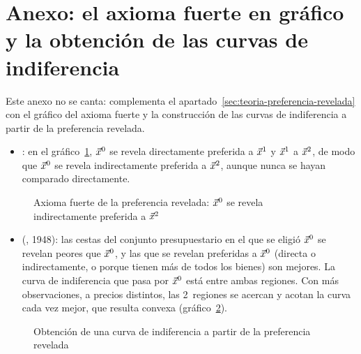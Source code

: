 \documentclass[11pt]{article}
\begin{document}
\section{Anexo: el axioma fuerte en gráfico\cortetitulo{} y la obtención de las curvas de indiferencia}\label{anexo:afpr}

\begin{notaopositor}
Este anexo no se canta: complementa el apartado~\ref{sec:teoria-preferencia-revelada} con el gráfico del axioma fuerte y la construcción de las curvas de indiferencia a partir de la preferencia revelada.
\end{notaopositor}

\begin{itemize}
\item {}: en el gráfico~\ref{fig:afpr}, $\vec{x}^0$ se revela directamente preferida a $\vec{x}^1$ y $\vec{x}^1$ a $\vec{x}^2$, de modo que $\vec{x}^0$ se revela indirectamente preferida a $\vec{x}^2$, aunque nunca se hayan comparado directamente.
\end{itemize}

\begin{figure}[H]
\centering
\caption{Axioma fuerte de la preferencia revelada: $\vec{x}^0$ se revela indirectamente preferida a $\vec{x}^2$}\label{fig:afpr}
\end{figure}

\begin{itemize}
\item {} (, 1948): las cestas del conjunto presupuestario en el que se eligió $\vec{x}^0$ se revelan peores que $\vec{x}^0$, y las que se revelan preferidas a $\vec{x}^0$ (directa o indirectamente, o porque tienen más de todos los bienes) son mejores. La curva de indiferencia que pasa por $\vec{x}^0$ está entre ambas regiones. Con más observaciones, a precios distintos, las 2~regiones se acercan y acotan la curva cada vez mejor, que resulta convexa (gráfico~\ref{fig:preferencia-revelada-indiferencia}).
\end{itemize}

\begin{figure}[H]
\centering
\caption{Obtención de una curva de indiferencia a partir de la preferencia revelada}\label{fig:preferencia-revelada-indiferencia}
\end{figure}
\end{document}
